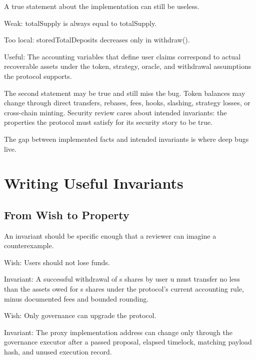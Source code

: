 A true statement about the implementation can still be useless.

\begin{codeblock}
Weak:
    totalSupply is always equal to totalSupply.

Too local:
    storedTotalDeposits decreases only in withdraw().

Useful:
    The accounting variables that define user claims correspond to
    actual recoverable assets under the token, strategy, oracle, and
    withdrawal assumptions the protocol supports.
\end{codeblock}

The second statement may be true and still miss the bug. Token balances may change through direct transfers, rebases, fees, hooks, slashing, strategy losses, or cross-chain minting. Security review cares about intended invariants: the properties the protocol must satisfy for its security story to be true.

The gap between implemented facts and intended invariants is where deep bugs live.

\section{Writing Useful Invariants}

\subsection{From Wish to Property}

An invariant should be specific enough that a reviewer can imagine a counterexample.

\begin{codeblock}
Wish:
    Users should not lose funds.

Invariant:
    A successful withdrawal of s shares by user u must transfer no less
    than the assets owed for s shares under the protocol's current
    accounting rule, minus documented fees and bounded rounding.
\end{codeblock}

\begin{codeblock}
Wish:
    Only governance can upgrade the protocol.

Invariant:
    The proxy implementation address can change only through the
    governance executor after a passed proposal, elapsed timelock,
    matching payload hash, and unused execution record.
\end{codeblock}

